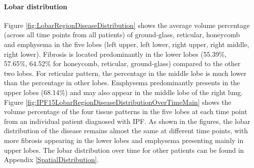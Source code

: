\paragraph{Lobar distribution}
Figure \ref{fig:LobarRegionDiseaseDistribution} shows the average volume percentage (across all time points from all patients) of ground-glass, reticular, honeycomb and emphysema in the five lobes (left upper, left lower, right upper, right middle, right lower). Fibrosis is located predominantly in the lower lobes (55.39\%, 57.65\%, 64.52\% for honeycomb, reticular, ground-glass) compared to the other two lobes. For reticular pattern, the percentage in the middle lobe is much lower than the percentage in other lobes. Emphysema predominantly presents in the upper lobes (68.14\%) and may also appear in the middle lobe of the right lung. Figure \ref{fig:IPF15LobarRegionDiseaseDistributionOverTimeMain} shows the volume percentage of the four tissue patterns in the five lobes at each time point from an individual patient diagnosed with IPF. As shown in the figures, the lobar distribution of the disease remains almost the same at different time points, with more fibrosis appearing in the lower lobes and emphysema presenting mainly in upper lobes. The lobar distribution over time for other patients can be found in Appendix \ref{SpatialDistribution}.
\newpage

